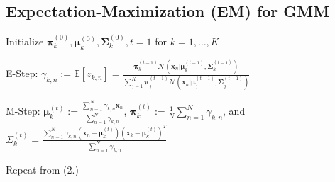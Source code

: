 \documentclass[a4paper, 11pt, landscape]{article}
\begin{document}
\begin{multicols*}{3}


\section{Expectation-Maximization (EM) for GMM}
\begin{compactenum}
	\item Initialize $\boldsymbol{\pi}_k^{(0)}, \boldsymbol{\mu}_k^{(0)}, \boldsymbol{\Sigma}_k^{(0)}, t = 1$ for $k = 1, \ldots, K$
	\item E-Step: $\gamma_{k,n} := \mathbb{E}[z_{k,n}] = \frac{\boldsymbol{\pi}_k^{(t-1)} \mathcal{N}(\mathbf{x}_n | \boldsymbol{\mu}_k^{(t-1)}, \boldsymbol{\Sigma}_k^{(t-1)})}{\sum_{j=1}^K \boldsymbol{\pi}_j^{(t-1)} \mathcal{N}(\mathbf{x}_n | \boldsymbol{\mu}_j^{(t-1)}, \boldsymbol{\Sigma}_j^{(t-1)})}$
	\item M-Step: $\boldsymbol{\mu}_k^{(t)} := \frac{\sum_{n=1}^N \gamma_{k,n} \mathbf{x}_n}{\sum_{n=1}^N \gamma_{k,n}}$, $\boldsymbol{\pi}_k^{(t)} := \frac{1}{N} \sum_{n=1}^N \gamma_{k,n}$, and \\ $\Sigma_k^{(t)} = \frac{\sum_{n=1}^N \gamma_{k, n} (\mathbf{x}_n - \boldsymbol{\mu}_k^{(t)})(\mathbf{x}_k - \boldsymbol{\mu}_k^{(t)})^T}{\sum_{n=1}^N \gamma_{k,n}}$
	\item Repeat from (2.)
\end{compactenum}



\end{multicols*}
\end{document}
